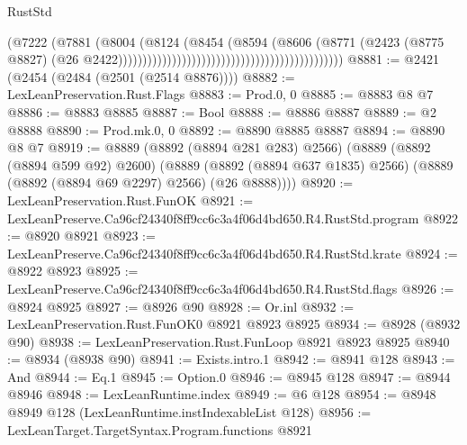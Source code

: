 \begin{lexlean}{RustStd}
\begin{coremodule}
                                                                            (@7222
                                                                              (@7881
                                                                                (@8004
                                                                                  (@8124
                                                                                    (@8454
                                                                                      (@8594
                                                                                        (@8606
                                                                                          (@8771
                                                                                            (@2423
                                                                                              (@8775
                                                                                                @8827)
                                                                                              (@26
                                                                                                @2422))))))))))))))))))))))))))))))))))))))))))))))
@8881 := @2421 (@2454 (@2484 (@2501 (@2514 @8876))))
@8882 := LexLeanPreservation.Rust.Flags
@8883 := Prod.{0, 0}
@8885 := @8883 @8 @7
@8886 := @8883 @8885
@8887 := Bool
@8888 := @8886 @8887
@8889 := @2 @8888
@8890 := Prod.mk.{0, 0}
@8892 := @8890 @8885 @8887
@8894 := @8890 @8 @7
@8919 := @8889
    (@8892 (@8894 @281 @283) @2566)
    (@8889
      (@8892 (@8894 @599 @92) @2600)
      (@8889 (@8892 (@8894 @637 @1835) @2566) (@8889 (@8892 (@8894 @69 @2297) @2566) (@26 @8888))))
@8920 := LexLeanPreservation.Rust.FunOK
@8921 := LexLeanPreserve.Ca96cf24340f8ff9cc6c3a4f06d4bd650.R4.RustStd.program
@8922 := @8920 @8921
@8923 := LexLeanPreserve.Ca96cf24340f8ff9cc6c3a4f06d4bd650.R4.RustStd.krate
@8924 := @8922 @8923
@8925 := LexLeanPreserve.Ca96cf24340f8ff9cc6c3a4f06d4bd650.R4.RustStd.flags
@8926 := @8924 @8925
@8927 := @8926 @90
@8928 := Or.inl
@8932 := LexLeanPreservation.Rust.FunOK0 @8921 @8923 @8925
@8934 := @8928 (@8932 @90)
@8938 := LexLeanPreservation.Rust.FunLoop @8921 @8923 @8925
@8940 := @8934 (@8938 @90)
@8941 := Exists.intro.{1}
@8942 := @8941 @128
@8943 := And
@8944 := Eq.{1}
@8945 := Option.{0}
@8946 := @8945 @128
@8947 := @8944 @8946
@8948 := LexLeanRuntime.index
@8949 := @6 @128
@8954 := @8948 @8949 @128 (LexLeanRuntime.instIndexableList @128)
@8956 := LexLeanTarget.TargetSyntax.Program.functions @8921

\end{coremodule}
\end{lexlean}
